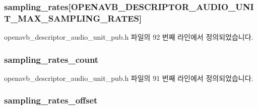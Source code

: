 \subsubsection[{\texorpdfstring{sampling\+\_\+rates}{sampling_rates}}]{ sampling\+\_\+rates\mbox{[}{\bf O\+P\+E\+N\+A\+V\+B\+\_\+\+D\+E\+S\+C\+R\+I\+P\+T\+O\+R\+\_\+\+A\+U\+D\+I\+O\+\_\+\+U\+N\+I\+T\+\_\+\+M\+A\+X\+\_\+\+S\+A\+M\+P\+L\+I\+N\+G\+\_\+\+R\+A\+T\+ES}\mbox{]}}\hypertarget{structopenavb__aem__descriptor__audio__unit__t_a71e4927bd492622a0b807cb9feb78672}{}\label{structopenavb__aem__descriptor__audio__unit__t_a71e4927bd492622a0b807cb9feb78672}


openavb\+\_\+descriptor\+\_\+audio\+\_\+unit\+\_\+pub.\+h 파일의 92 번째 라인에서 정의되었습니다.

\subsubsection[{\texorpdfstring{sampling\+\_\+rates\+\_\+count}{sampling_rates_count}}]{ sampling\+\_\+rates\+\_\+count}\hypertarget{structopenavb__aem__descriptor__audio__unit__t_a75b9a3bf65c881bc71b05d983793aa62}{}\label{structopenavb__aem__descriptor__audio__unit__t_a75b9a3bf65c881bc71b05d983793aa62}


openavb\+\_\+descriptor\+\_\+audio\+\_\+unit\+\_\+pub.\+h 파일의 91 번째 라인에서 정의되었습니다.

\subsubsection[{\texorpdfstring{sampling\+\_\+rates\+\_\+offset}{sampling_rates_offset}}]{ sampling\+\_\+rates\+\_\+offset}\hypertarget{structopenavb__aem__descriptor__audio__unit__t_a7359eabb4872379de15e9e771f7f9881}{}\label{structopenavb__aem__descriptor__audio__unit__t_a7359eabb4872379de15e9e771f7f9881}


